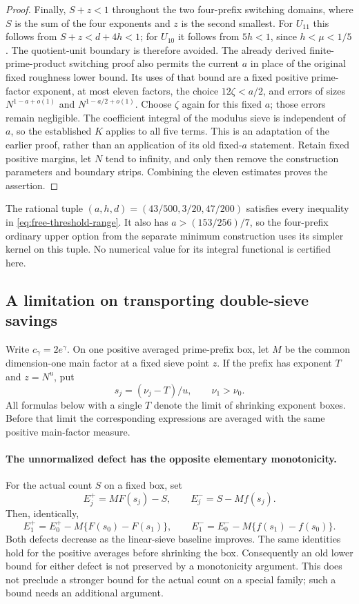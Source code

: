\documentclass[11pt]{article}
\begin{document}
\begin{proof}
Finally, $S+z<1$ throughout the two four-prefix switching domains,
where $S$ is the sum of the four exponents and $z$ is the second
smallest. For $U_{11}$ this follows from $S+z<d+4h<1$;
for $U_{10}$ it follows from $5h<1$, since $h<\mu<1/5$.
The quotient-unit boundary is therefore avoided. The already derived
finite-prime-product switching proof also permits the current $a$ in
place of the original fixed roughness lower bound. Its uses of that
bound are a fixed positive prime-factor exponent, at most eleven
factors, the choice $12\zeta<a/2$, and errors of sizes
$N^{1-a+o(1)}$ and $N^{1-a/2+o(1)}$. Choose $\zeta$ again for this
fixed $a$; those errors remain negligible. The coefficient integral
of the modulus sieve is independent of $a$, so the established
$K$ applies to all five terms. This is an adaptation of the earlier
proof, rather than an application of its old fixed-$a$ statement.
Retain fixed positive margins, let $N$ tend to
infinity, and only then remove the construction parameters and
boundary strips. Combining the eleven estimates proves the assertion.
\end{proof}

The rational tuple $(a,h,d)=(43/500,3/20,47/200)$ satisfies every
inequality in \eqref{eq:free-threshold-range}. It also has
$a>(153/256)/7$, so the four-prefix ordinary upper option from the
separate minimum construction uses its simpler kernel on this tuple.
No numerical value for its integral functional is certified here.

\subsection{A limitation on transporting double-sieve savings}
\label{sec:mixed-level-bridge-followup}

Write $c_\gamma=2e^\gamma$. On one positive averaged prime-prefix
box, let $M$ be the common dimension-one main factor at a fixed sieve
point $z$. If the prefix has exponent $T$ and $z=N^u$, put
\[
 s_j=(\nu_j-T)/u,\qquad \nu_1>\nu_0.
\]
All formulas below with a single $T$ denote the limit of shrinking
exponent boxes. Before that limit the corresponding expressions are
averaged with the same positive main-factor measure.

\paragraph{The unnormalized defect has the opposite elementary monotonicity.}
For the actual count $S$ on a fixed box, set
\[
 E_j^+=M F(s_j)-S,\qquad E_j^-=S-Mf(s_j).
\]
Then, identically,
\[
 E_1^+=E_0^+-M\{F(s_0)-F(s_1)\},\qquad
 E_1^-=E_0^--M\{f(s_1)-f(s_0)\}.
\]
Both defects decrease as the linear-sieve baseline improves. The same
identities hold for the positive averages before shrinking the box.
Consequently an old lower bound for either defect is not preserved by
a monotonicity argument. This does not preclude a stronger bound for
the actual count on a special family; such a bound needs an additional
argument.
\end{document}
